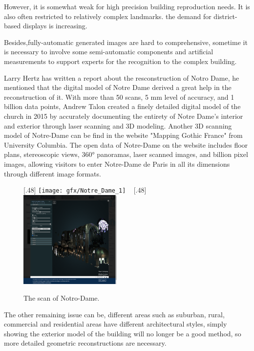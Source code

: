 However, it is somewhat weak for high precision building reproduction needs. It is also often restricted to relatively complex landmarks.  the demand for district-based displays is increasing. 

Besides,fully-automatic generated images are hard to comprehensive, sometime it is necessary to involve some semi-automatic components and artificial measurements to support experts for the recognition to the complex building.

Larry Hertz has written a report about the resconstruction of Notro Dame, he mentioned that the digital model of Notre Dame  derived a great help in the reconstruction of it. With more than 50 scans, 5 mm level of accuracy, and 1 billion data points, Andrew Talon created a finely detailed digital model of the church in 2015 by accurately documenting the entirety of Notre Dame's interior and exterior through laser scanning and 3D modeling. Another 3D scanning model of Notre-Dame can be find in the website "Mapping Gothic France" from University Columbia. The open data of Notre-Dame on the website includes floor plans, stereoscopic views, 360° panoramas, laser scanned images, and billion pixel images, allowing visitors to enter Notre-Dame de Paris in all its dimensions through different image formats.

\begin{figure}[htb]
	\centering	
	[.48\linewidth]{
		\texttt{[image: gfx/Notre\_Dame\_1]} 	
	}  	
	~
	[.48\linewidth]{
		\includegraphics[width=0.45\textwidth]{gfx/Notre_Dame_2}  	
	}	  
	
	\caption{The scan of Notro-Dame.}
	\label{fig:Notro-Dame}
\end{figure}


The other remaining issue can be, different areas such as suburban, rural, commercial and residential areas have different architectural styles, simply showing the exterior model of the building will no longer be a good method, so more detailed geometric reconstructions are necessary. 



